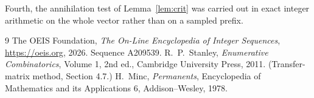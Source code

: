 \documentclass[11pt,a4paper]{article}
\theoremstyle{plain}
\theoremstyle{definition}
\begin{document}
Fourth, the annihilation test of Lemma~\ref{lem:crit} was carried out in exact integer
arithmetic on the whole vector rather than on a sampled prefix.

\begin{thebibliography}{9}
 The OEIS Foundation, \emph{The On-Line Encyclopedia of Integer
Sequences}, \url{https://oeis.org}, 2026. Sequence A209539.
 R.~P.~Stanley, \emph{Enumerative Combinatorics}, Volume 1, 2nd ed.,
Cambridge University Press, 2011. (Transfer-matrix method, Section 4.7.)
 H.~Minc, \emph{Permanents}, Encyclopedia of Mathematics and its
Applications 6, Addison--Wesley, 1978.
\end{thebibliography}
\end{document}
